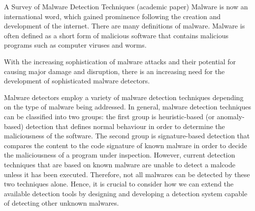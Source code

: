 A Survey of Malware Detection Techniques (academic paper)
Malware is now an international word, which gained prominence following the creation and development of the internet. There are many definitions of malware. Malware is often defined as a short form of malicious software that contains malicious programs such as computer viruses and worms. 

With the increasing sophistication of malware attacks and their potential for causing major damage and disruption, there is an increasing need for the development of sophisticated malware detectors.

Malware detectors employ a variety of malware detection techniques depending on the type of malware being addressed. In general, malware detection techniques can be classified into two groups: the first group is heuristic-based (or anomaly-based) detection that defines normal behaviour in order to determine the maliciousness of the software. The second group is signature-based detection that compares the content to the code signature of known malware in order to decide the maliciousness of a program under inspection. However, current detection techniques that are based on known malware are unable to detect a malcode unless it has been executed. Therefore, not all malwares can be detected by these two techniques alone. Hence, it is crucial to consider how we can extend the available detection tools by designing and developing a detection system capable of detecting other unknown malwares.
 
